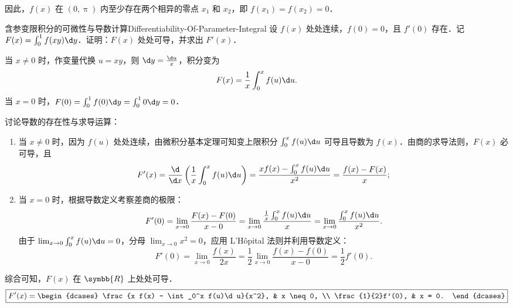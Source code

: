 \begin{myproof}
    因此，$f(x)$ 在 $(0, \uppi)$ 内至少存在两个相异的零点 $x_1$ 和 $x_2$，即 $f(x_1) = f(x_2) = 0$．
\end{myproof}

\begin{problem}{含参变限积分的可微性与导数计算}{Differentiability-Of-Parameter-Integral}
    设 $f(x)$ 处处连续，$f(0) = 0$，且 $f'(0)$ 存在．记 $F(x) = \int_0^1 f(xy) \d y$．证明：$F(x)$ 处处可导，并求出 $F'(x)$．
\end{problem}

\begin{solution}
    当 $x \neq 0$ 时，作变量代换 $u = xy$，则 $\d y = \frac{\d u}{x}$，积分变为
    \begin{equation}
        F(x) = \frac{1}{x}\int_0^x f(u) \d u.
    \end{equation}
    当 $x = 0$ 时，$F(0) = \int_0^1 f(0) \d y = \int_0^1 0 \d y = 0$．

    讨论导数的存在性与求导运算：
    \begin{enumerate}
        \item 当 $x \neq 0$ 时，因为 $f(u)$ 处处连续，由微积分基本定理可知变上限积分 $\int_0^x f(u)\d u$ 可导且导数为 $f(x)$．由商的求导法则，$F(x)$ 必可导，且
              \begin{equation}
                  F'(x) = \frac{\d}{\d x}\left( \frac{1}{x}\int_0^x f(u)\d u \right) = \frac{x f(x) - \int_0^x f(u)\d u}{x^2} = \frac{f(x) - F(x)}{x};
              \end{equation}
        \item 当 $x = 0$ 时，根据导数定义考察差商的极限：
              \begin{equation}
                  F'(0) = \lim_{x\to 0} \frac{F(x) - F(0)}{x - 0} = \lim_{x\to 0} \frac{\frac{1}{x}\int_0^x f(u)\d u}{x} = \lim_{x\to 0} \frac{\int_0^x f(u)\d u}{x^2}.
              \end{equation}
              由于 $\lim_{x\to 0} \int_0^x f(u)\d u = 0$，分母 $\lim_{x\to 0} x^2 = 0$，应用 L'Hôpital 法则并利用导数定义：
              \begin{equation}
                  F'(0) = \lim_{x\to 0} \frac{f(x)}{2x} = \frac{1}{2} \lim_{x\to 0} \frac{f(x) - f(0)}{x - 0} = \frac{1}{2} f'(0).
              \end{equation}
    \end{enumerate}
    综合可知，$F(x)$ 在 $\symbb{R}$ 上处处可导．
    \begin{equation}
        \boxed{F'(x) = \begin{dcases} \frac{x f(x) - \int_0^x f(u)\d u}{x^2}, & x \neq 0, \\ \frac{1}{2}f'(0), & x = 0. \end{dcases}}
    \end{equation}
\end{solution}

